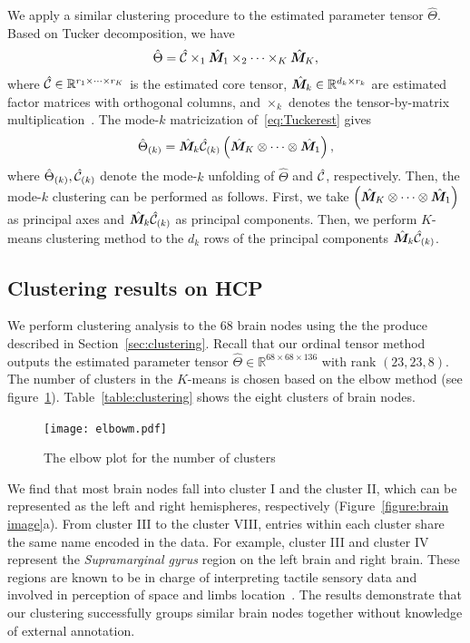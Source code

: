 \documentclass[11pt]{article}
\theoremstyle{plain}
\theoremstyle{definition}
\begin{document}
We apply a similar clustering procedure to the estimated parameter tensor $\hat\Theta$. Based on Tucker decomposition, we have
\begin{equation}\label{eq:Tuckerest}
\hat \Theta = \hat {\mathcal{C}}\times_1\hat {\bm M}_1\times_2\cdots\times_K\hat {\bm M}_K,
\end{equation}
where $\hat {\mathcal{C}}\in\mathbb{R}^{r_1\times \cdots \times r_K}$ is the estimated core tensor, $\hat {\bm M}_k\in\mathbb{R}^{d_k\times r_k}$ are estimated factor matrices with orthogonal columns, and $\times_k$ denotes the tensor-by-matrix multiplication~\citep{kolda2009tensor}. The mode-$k$ matricization of~\eqref{eq:Tuckerest} gives
\begin{equation}
\hat \Theta_{(k)} = \hat {\bm M}_k\hat {\mathcal{C}}_{(k)}\left(\hat {\bm M}_K\otimes\cdots\otimes\hat {\bm M}_1\right),
\end{equation}
where $\hat \Theta_{(k)} , \hat {\mathcal{C}}_{(k)}$ denote the mode-$k$ unfolding of $\hat \Theta$ and $\hat {\mathcal{C}}$, respectively. Then, the mode-$k$ clustering can be performed as follows. First, we take $\left(\hat {\bm M}_K\otimes\cdots\otimes\hat {\bm M}_1\right)$ as principal axes and $\hat {\bm M}_k\hat {\mathcal{C}}_{(k)}$ as principal components. Then, we perform $K$-means clustering method to the $d_k$ rows of the principal components $\hat {\bm M}_k\hat {\mathcal{C}}_{(k)}$.

\subsection{Clustering results on HCP}
We perform clustering analysis to the 68 brain nodes using the the produce described in Section~\ref{sec:clustering}. Recall that our ordinal tensor method outputs the estimated parameter tensor $\hat\Theta\in\mathbb{R}^{68\times 68\times136}$ with rank $(23,23,8)$.
The number of clusters in the $K$-means is chosen based on the elbow method (see figure~\ref{figure:elbow}). Table~\ref{table:clustering} shows the eight clusters of brain nodes.
\begin{figure}[H]
  \label{figure:elbow}
  \begin{center}
    \texttt{[image: elbowm.pdf]}
  \end{center}
  \caption{The elbow plot for the number of clusters}
\end{figure}


We find that most brain nodes fall into cluster I and the cluster II, which can be represented as the left and right hemispheres, respectively (Figure~\ref{figure:brain image}a). From cluster III to the cluster VIII, entries within each cluster share the same name encoded in the data. For example, cluster III and cluster IV represent the {\it Supramarginal gyrus} region on the left brain and right brain. These regions are known to be in charge of interpreting tactile sensory data and involved in perception of space and limbs location~\cite{carlson2012physiology,reed1994nature}.
The results demonstrate that our clustering successfully groups similar brain nodes together without knowledge of external annotation.
\end{document}
